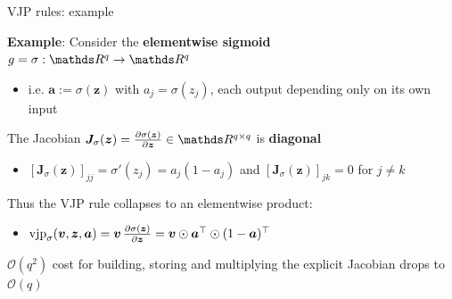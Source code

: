 \documentclass[11pt,compress,t,notes=noshow, xcolor=table]{beamer}
\newcommand{\zv}{\bm{z}}                 %
\begin{document}
\begin{framei}{VJP rules: example}
\item \textbf{Example}: Consider the \textbf{elementwise sigmoid} $g = \sigma: \R^{q} \to \R^{q}$
\begin{itemize}
  \item i.e. $\bm{a} := \sigma(\zv)$ with $a_j = \sigma(z_j)$, each output depending only on its own input
\end{itemize}
\item The Jacobian $\bm{J}_{\sigma}(\zv) = \pd{\sigma(\zv)}{\zv} \in \R^{q \times q}$ is \textbf{diagonal}
\begin{itemize}
\item $[\bm{J}_{\sigma}(\zv)]_{jj} = \sigma'(z_j) = a_j(1 - a_j)$ and $[\bm{J}_{\sigma}(\zv)]_{jk} = 0$ for $j \neq k$
\end{itemize}
%
\item Thus the VJP rule collapses to an elementwise product:
\begin{itemize}
\item $\text{vjp}_\sigma(\bm{v}, \zv, \bm{a}) = \bm{v} \, \pd{\sigma(\zv)}{\zv} = \bm{v} \odot \bm{a}^\top \odot (1 - \bm{a})^\top$
\end{itemize}
\item[$\Rightarrow$] $\mathcal{O}(q^2)$ cost for building, storing and multiplying the explicit Jacobian drops to $\mathcal{O}(q)$
\end{framei}
\end{document}
